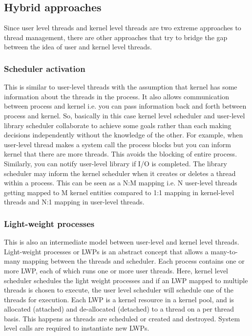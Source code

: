 \documentclass[twoside]{article}
\begin{document}
\subsection{Hybrid approaches}
Since user level threads and kernel level threads are two extreme approaches to thread management, there are other approaches that try to bridge the gap between the idea of user and kernel level threads.

\subsubsection{Scheduler activation}
This is similar to user-level threads with the assumption that kernel has some information about the threads in the process. It also allows communication between process and kernel i.e. you can pass information back and forth between process and kernel. So, basically in this case kernel level scheduler and user-level library scheduler collaborate to achieve some goals rather than each making decisions independently without the knowledge of the other. For example, when user-level thread makes a system call the process blocks but you can inform kernel that there are more threads. This avoids the blocking of entire process. Similarly, you can notify user-level library if I/O is completed. The library scheduler may inform the kernel scheduler
when it creates or deletes a thread within a process. This can be seen as a N:M mapping i.e. N user-level threads getting mapped to M kernel entities compared to 1:1 mapping in kernel-level threads and N:1 mapping in user-level threads. 

\subsubsection{Light-weight processes}
This is also an intermediate model between user-level and kernel level threads. Light-weight processes or LWPs is an abstract concept that allows a many-to-many mapping between the threads and scheduler. Each process contains one or more LWP, each of which runs one or more user threads. Here, kernel level scheduler schedules the light weight processes  and if an LWP mapped to multiple threads is chosen to execute, the user level scheduler will schedule one of the threads for execution. Each LWP is a kernel resource in a kernel pool, and is allocated (attached) and de-allocated (detached) to a thread on a per thread basis. This happens as threads are scheduled or created and destroyed. System level calls are required to instantiate new LWPs.\\
\end{document}
